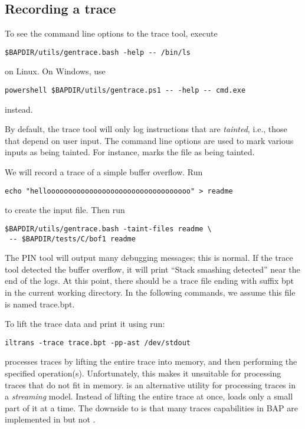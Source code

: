 \subsection{Recording a trace}

To see the command line options to the trace tool, execute

\begin{verbatim}
$BAPDIR/utils/gentrace.bash -help -- /bin/ls
\end{verbatim}
on Linux.  On Windows, use
\begin{verbatim}
powershell $BAPDIR/utils/gentrace.ps1 -- -help -- cmd.exe
\end{verbatim}
instead.

By default, the trace tool will only log instructions that are
\emph{tainted}, i.e., those that depend on user input.  The
 command line options are used to mark various
inputs as being tainted.  For instance, 
marks the file  as being tainted.

We will record a trace of a simple buffer overflow.  Run

\begin{verbatim}
echo "helloooooooooooooooooooooooooooooooooo" > readme
\end{verbatim}

to create the input file.  Then run

\begin{verbatim}
$BAPDIR/utils/gentrace.bash -taint-files readme \
 -- $BAPDIR/tests/C/bof1 readme
\end{verbatim}

The PIN tool will output many debugging messages; this is normal.  If
the trace tool detected the buffer overflow, it will print ``Stack
smashing detected'' near the end of the logs.  At this point, there
should be a trace file ending with suffix bpt in the current working
directory.  In the following commands, we assume this file is named
trace.bpt.

To lift the trace data and print it using  run:

\begin{verbatim}
iltrans -trace trace.bpt -pp-ast /dev/stdout
\end{verbatim}

 processes traces by lifting the entire trace into
memory, and then performing the specified operation(s).
Unfortunately, this makes it unsuitable for processing traces that do
not fit in memory.  \cmdline{streamtrans} is an alternative utility
for processing traces in a \emph{streaming} model.  Instead of lifting
the entire trace at once,  loads only a small
part of it at a time.  The downside to  is that
many traces capabilities in BAP are implemented in \cmdline{iltrans}
but not \cmdline{streamtrans}.

